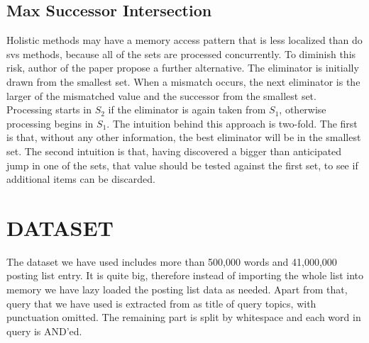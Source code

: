\documentclass[paper=a4, fontsize=11pt]{scrartcl} %
\numberwithin{equation}{section} %
\numberwithin{figure}{section} %
\numberwithin{table}{section} %
\begin{document}
\subsection{Max Successor Intersection}

Holistic methods may have a memory access pattern that is less localized than do svs methods, because all of the sets are processed concurrently. To diminish this risk, author of the paper propose a further alternative. The eliminator is initially drawn from the smallest set. When a mismatch occurs, the next eliminator is the larger of the mismatched value and the successor from the smallest set. Processing starts in $S_{2}$ if the eliminator is again taken from $S_{1}$, otherwise processing begins in $S_{1}$. The intuition behind this approach is two-fold. The first is that, without any other information, the best eliminator will be in the smallest set. The second intuition is that, having discovered a bigger than anticipated jump in one of the sets, that value should be tested against the first set, to see if additional items can be discarded.


\section{DATASET}

The dataset we have used includes more than 500,000 words and 41,000,000 posting list entry. It is quite big, therefore instead of importing the whole list into memory we have lazy loaded the posting list data as needed. Apart from that, query that we have used is extracted from as title of query topics, with punctuation omitted. The remaining part is split by whitespace and each word in query is AND'ed.

\newpage
\end{document}
